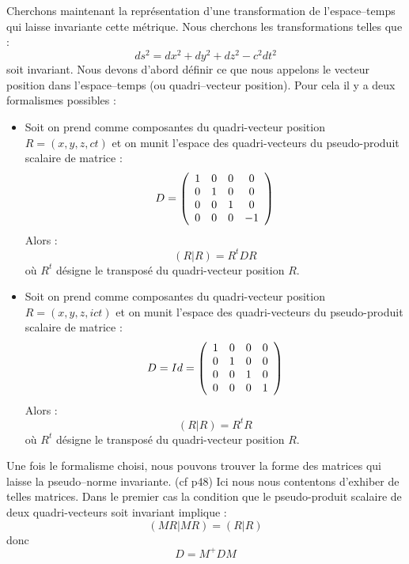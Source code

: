 \documentclass[12pt]{book}
\begin{document}
Cherchons maintenant la repr\'esentation d'une transformation de
l'espace--temps qui laisse invariante cette m\'etrique.
Nous cherchons les transformations telles que :
\begin{equation}
ds^2=dx^2+dy^2+dz^2-c^2dt^2
\end{equation}
soit invariant.
Nous devons d'abord d\'efinir ce que nous appelons le vecteur position
dans l'espace--temps (ou quadri--vecteur position).
Pour cela il y a deux formalismes possibles :
\begin{itemize}
\item Soit on prend comme composantes du quadri-vecteur position
$R=(x,y,z,ct)$ et on munit l'espace des quadri-vecteurs du pseudo-produit scalaire
de matrice :
\begin{equation}
D=
\left( \begin{array}{cccc}
1&0&0&0 \cr
0&1&0&0\cr
0&0&1&0\cr
0&0&0&-1\cr
\end{array} \right)
\end{equation}
Alors :
\begin{equation}
(R|R)=R^tDR
\end{equation}
o\`u $R^t$ d\'esigne le transpos\'e du quadri-vecteur position $R$.
\item Soit on prend comme composantes du quadri-vecteur position
$R=(x,y,z,ict)$ et on munit l'espace des quadri-vecteurs du pseudo-produit scalaire
de matrice :
\begin{equation}
D=Id=
\left( \begin{array}{cccc}
1&0&0&0 \cr
0&1&0&0\cr
0&0&1&0\cr
0&0&0&1\cr
    \end{array} \right)      
\end{equation}
Alors :
\begin{equation}
(R|R)=R^tR
\end{equation}
o\`u $R^t$ d\'esigne le transpos\'e du quadri-vecteur position $R$.
\end{itemize}
Une fois le formalisme choisi, nous pouvons trouver la forme des
matrices qui laisse la pseudo--norme invariante. (cf \cite{ph:relat:Hakim94}
p48) Ici 
nous nous contentons d'exhiber de telles matrices.
Dans le premier cas la condition que le pseudo-produit scalaire de
deux quadri-vecteurs soit invariant implique :
\begin{equation}
(MR|MR)=(R|R)
\end{equation}
donc
\begin{equation}
D=M^+DM
\label{cond}
\end{equation}
\end{document}
